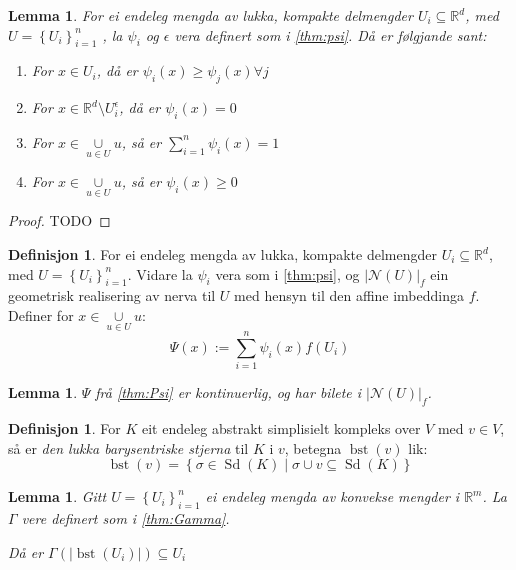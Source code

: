 \documentclass[a4paper, titlepage, 12pt, norsk]{article}
\theoremstyle{plain}
\newtheorem{lemma}[theorem]{Lemma}
\theoremstyle{definition}
\newtheorem{definition}[theorem]{Definisjon}
\newcommand{\Rb}{\mathbb{R}}
\newcommand{\Nc}{\mathcal{N}}
\newcommand{\union}{ \mathop{\cup}\limits }
\newcommand{\gr}[1]{ \lvert #1 \rvert } %
\newcommand{\set}[1]{ \left \{ #1 \right \} } %
\DeclareMathOperator{\Sd}{Sd}
\DeclareMathOperator{\bst}{bst}
\begin{document}
\begin{lemma} %
	For ei endeleg mengda av lukka, kompakte delmengder \( U_i \subseteq \Rb^d \), med \( U = \set{U_i}_{i=1}^n \) , la \( \psi_i \) og \( \epsilon \) vera definert som i \autoref{thm:psi}. Då er følgjande sant:
	\begin{enumerate}
		\item{For \( x \in  U_i \), då er \( \psi_i(x) \geq \psi_j(x) \forall j \) }
		\item{For \( x \in \Rb^d \setminus U_i^\epsilon \), då er \( \psi_i(x)=0 \) }
		\item{For \( x \in \union_{u \in U} u \), så er \( \sum_{i=1}^n \psi_i(x) = 1 \) }
		\item{For \( x \in \union_{u \in U} u \), så er \( \psi_i(x) \geq 0 \) }
	\end{enumerate}
\end{lemma}

\begin{proof}
	TODO
\end{proof}

\begin{definition} \label{thm:Psi}
	For ei endeleg mengda av lukka, kompakte delmengder \( U_i \subseteq \Rb^d \), med \( U = \set{U_i}_{i=1}^n \). Vidare la \( \psi_i \) vera som i \autoref{thm:psi}, og \( \gr{\Nc(U)}_f \) ein geometrisk realisering av nerva til \( U \) med hensyn til den affine imbeddinga \( f \). Definer for \( x \in \union_{u \in U} u \):
	\[
		\Psi(x) := \sum_{i=1}^n \psi_i(x)f(U_i)
	\]
\end{definition}

\begin{lemma} %
	\( \Psi \) frå \autoref{thm:Psi} er kontinuerlig, og har bilete i \( \gr{\Nc(U)}_f \).
\end{lemma}

\begin{definition}
	For \( K \) eit endeleg abstrakt simplisielt kompleks over \( V \) med \( v \in V \), så er \emph{den lukka barysentriske stjerna} til \( K \) i \( v \), betegna \( \bst(v) \) lik:
	\[
		\bst(v) = \set{\sigma \in \Sd(K) \mid \sigma \union v \subseteq \Sd(K)}
	\]
\end{definition}

\begin{lemma}
	Gitt \( U = \set{U_i}_{i=1}^n \) ei endeleg mengda av konvekse mengder i \( \Rb^m \). La \( \Gamma \) vere definert som i \autoref{thm:Gamma}.

	Då er \( \Gamma(\gr{\bst(U_i)}) \subseteq U_i \)
\end{lemma}
\end{document}
